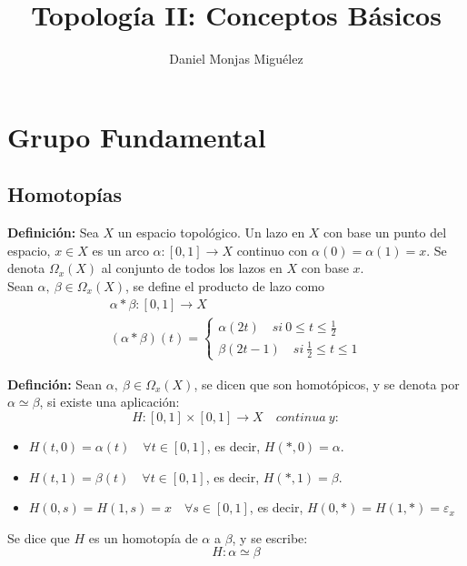 \documentclass{article}
\author{Daniel Monjas Miguélez}
\title{Topología II: Conceptos Básicos}
\begin{document}
\maketitle
\newpage
\tableofcontents
\newpage

\section{Grupo Fundamental}
\subsection{Homotopías}
\textbf{Definición:} Sea $X$ un espacio topológico. Un lazo en $X$ con base un punto del espacio, $x\in X$ es un arco $\alpha:[0,1]\rightarrow X$ continuo con $\alpha(0)=\alpha(1)=x$. Se denota $\Omega_{x}(X)$ al conjunto de todos los lazos en $X$ con base $x$. \\

Sean $\alpha,\:\beta\in \Omega_{x}(X)$, se define el producto de lazo como
\begin{gather*}
\alpha*\beta:[0,1]\rightarrow X \\
(\alpha*\beta)(t)=\left\lbrace \begin{array}{c}
\alpha(2t)\quad si\:0\leq t\leq \frac{1}{2} \\
\beta(2t-1)\quad si\:\frac{1}{2}\leq t\leq 1
\end{array} \right.
\end{gather*}

\textbf{Definción:} Sean $\alpha,\:\beta\in \Omega_x(X)$, se dicen que son homotópicos, y se denota por $\alpha\simeq \beta$, si existe una aplicación:
\begin{equation*}
H:[0,1]\times[0,1]\rightarrow X\quad continua\:y:
\end{equation*}

\begin{itemize}
\item $H(t,0)=\alpha(t)\quad \forall t\in [0,1]$, es decir, $H(*,0)=\alpha$.

\item $H(t,1)=\beta(t)\quad \forall t\in [0,1]$, es decir, $H(*,1)=\beta$.

\item $H(0,s)=H(1,s)=x\quad \forall s\in [0,1]$, es decir, $H(0,*)=H(1,*)=\varepsilon_x$
\end{itemize}

Se dice que $H$ es un homotopía de $\alpha$ a $\beta$, y se escribe:
\begin{equation*}
H:\alpha\simeq \beta
\end{equation*}
\end{document}

